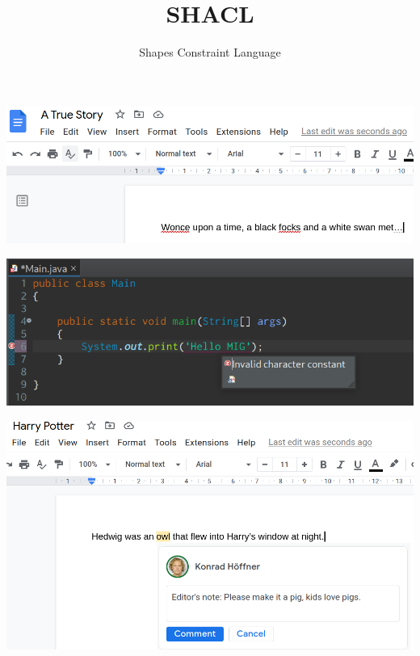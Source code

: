 \documentclass[14pt,aspectratio=1610]{beamer}
\title{SHACL}
\subtitle{Shapes Constraint Language}
\begin{document}
\begin{frame}
\titlepage
\end{frame}

\begin{frame}{}
\centering\includegraphics[width=1.05\textwidth,height=1.05\textheight,keepaspectratio]{img/spelling.png}
\end{frame}

\begin{frame}{}
\centering\includegraphics[width=1.05\textwidth,height=1.05\textheight,keepaspectratio]{img/javaerror.png}
\end{frame}

\begin{frame}{}
\centering\includegraphics[width=1.05\textwidth,height=1.05\textheight,keepaspectratio]{img/hedwig.png}
\end{frame}

\end{document}
